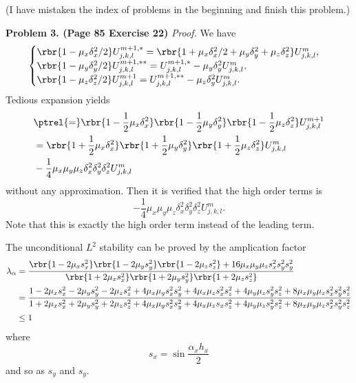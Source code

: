 \documentclass[english, nochinese]{pnote}
\begin{document}
(I have mistaken the index of problems in the beginning and finish this problem.)

\textbf{Problem 3. (Page 85 Exercise 22)} \textit{Proof.} We have
\begin{equation}
\begin{cases}
\rbr{ 1 - \mu_x \delta_x^2 / 2 } U_{ j, k, l }^{ m + 1, \ast } = \rbr{ 1 + \mu_x \delta_x^2 / 2 + \mu_y \delta_y^2 + \mu_z \delta_z^2 } U_{ j, k, l }^m, \\
\rbr{ 1 - \mu_y \delta_y^2 / 2 } U_{ j, k, l }^{ m + 1, \ast\ast } = U_{ j, k, l }^{ m + 1, \ast } - \mu_y \delta_y^2 U_{ j, k, l }^m, \\
\rbr{ 1 - \mu_z \delta_z^2 / 2 } U_{ j, k, l }^{ m + 1 } = U_{ j, k, l }^{ m + 1, \ast\ast } - \mu_z \delta_y^2 U_{ j, k, l }^m.
\end{cases}
\end{equation}
Tedious expansion yields
\begin{equation} \label{Eq:Exp}
\begin{split}
&\ptrel{=} \rbr{ 1 - \frac{1}{2} \mu_x \delta_x^2 } \rbr{ 1 - \frac{1}{2} \mu_y \delta_y^2 } \rbr{ 1 - \frac{1}{2} \mu_z \delta_z^2 } U_{ j, k, l }^{ m + 1 } \\
&= \rbr{ 1 + \frac{1}{2} \mu_x \delta_x^2 } \rbr{ 1 + \frac{1}{2} \mu_y \delta_y^2 } \rbr{ 1 + \frac{1}{2} \mu_z \delta_z^2 } U_{ j, k, l }^m \\
&- \frac{1}{4} \mu_x \mu_y \mu_z \delta_x^2 \delta_y^2 \delta_z^2 U_{ j, k, l }^m
\end{split}
\end{equation}
without any approximation. Then it is verified that the high order terms is
\begin{equation}
-\frac{1}{4} \mu_x \mu_y \mu_z \delta_x^2 \delta_y^2 \delta_z^2 U_{ j, k, l }^m.
\end{equation}
Note that this is exactly the high order term instead of the leading term.

The unconditional $L^2$ stability can be proved by the amplication factor
\begin{equation}
\begin{split}
\lambda_{\alpha} &= \frac{ \rbr{ 1 - 2 \mu_x s_x^2 } \rbr{ 1 - 2 \mu_y s_y^2 } \rbr{ 1 - 2 \mu_z s_z^2 } + 16 \mu_x \mu_y \mu_z s_x^2 s_y^2 s_y^2 }{ \rbr{ 1 + 2 \mu_x s_x^2 } \rbr{ 1 + 2 \mu_y s_y^2 } \rbr{ 1 + 2 \mu_z s_z^2 } } \\
&= \frac{ 1 - 2 \mu_x s_x^2 - 2 \mu_y s_y^2 - 2 \mu_z s_z^2 + 4 \mu_x \mu_y s_x^2 s_y^2 + 4 \mu_x \mu_z s_x^2 s_z^2 + 4 \mu_y \mu_z s_y^2 s_z^2 + 8 \mu_x \mu_y \mu_z s_x^2 s_y^2 s_z^2 }{ 1 + 2 \mu_x s_x^2 + 2 \mu_y s_y^2 + 2 \mu_z s_z^2 + 4 \mu_x \mu_y s_x^2 s_y^2 + 4 \mu_x \mu_z s_x s_z^2 + 4 \mu_y \mu_z s_y^2 s_z^2 + 8 \mu_x \mu_y \mu_z s_x^2 s_y^2 s_z^2 } \\
&\le 1
\end{split}
\end{equation}
where 
\begin{equation}
s_x = \sin \frac{ \alpha_x h_x }{2}
\end{equation}
and so as $s_y$ and $s_y$.
\end{document}
